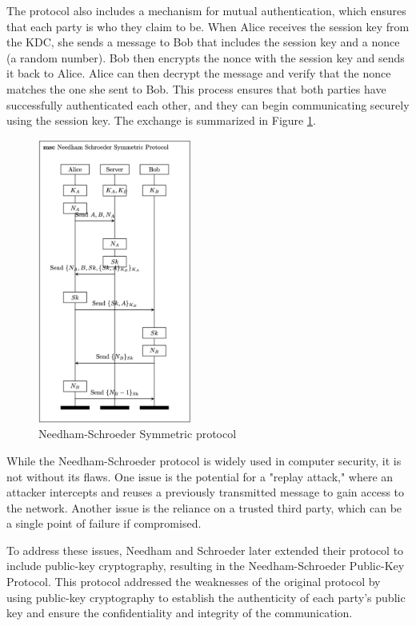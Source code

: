 \documentclass[fleqn,10pt]{SelfArx} %
\begin{document}
The protocol also includes a mechanism for mutual authentication, which ensures that each party is who they claim to be. When Alice receives the session key from the KDC, she sends a message to Bob that includes the session key and a nonce (a random number). Bob then encrypts the nonce with the session key and sends it back to Alice. Alice can then decrypt the message and verify that the nonce matches the one she sent to Bob. This process ensures that both parties have successfully authenticated each other, and they can begin communicating securely using the session key. The exchange is summarized in Figure \ref{fig:NS}.

\begin{figure}[h]
    \centering
    \captionsetup{justification=centering, margin=1cm}
    \includegraphics[width=0.45\textwidth]{Figures/NS.png}
    \caption{Needham-Schroeder Symmetric protocol}
    \label{fig:NS}
\end{figure}
%

While the Needham-Schroeder protocol is widely used in computer security, it is not without its flaws. One issue is the potential for a "replay attack," where an attacker intercepts and reuses a previously transmitted message to gain access to the network. Another issue is the reliance on a trusted third party, which can be a single point of failure if compromised.

To address these issues, Needham and Schroeder later extended their protocol to include public-key cryptography, resulting in the Needham-Schroeder Public-Key Protocol. This protocol addressed the weaknesses of the original protocol by using public-key cryptography to establish the authenticity of each party's public key and ensure the confidentiality and integrity of the communication.
\end{document}
